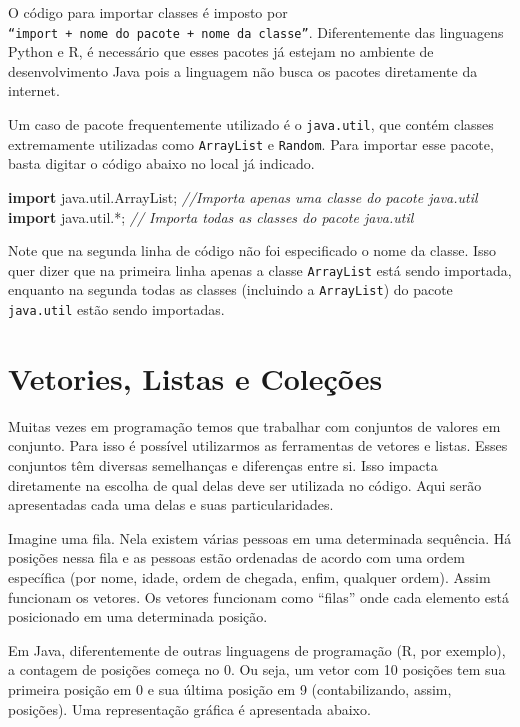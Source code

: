 \documentclass[
]{book}
\newenvironment{Shaded}{\begin{snugshade}}{\end{snugshade}}
\newcommand{\CommentTok}[1]{\textcolor[rgb]{0.56,0.35,0.01}{\textit{#1}}}
\newcommand{\ImportTok}[1]{#1}
\newcommand{\KeywordTok}[1]{\textcolor[rgb]{0.13,0.29,0.53}{\textbf{#1}}}
\begin{document}
O código para importar classes é imposto por \texttt{“import\ +\ nome\ do\ pacote\ +\ nome\ da\ classe”}. Diferentemente das linguagens Python e R, é necessário que esses pacotes já estejam no ambiente de desenvolvimento Java pois a linguagem não busca os pacotes diretamente da internet.

Um caso de pacote frequentemente utilizado é o \texttt{java.util}, que contém classes extremamente utilizadas como \texttt{ArrayList} e \texttt{Random}. Para importar esse pacote, basta digitar o código abaixo no local já indicado.

\begin{Shaded}
\begin{Highlighting}[]
\KeywordTok{import}\ImportTok{ java.util.ArrayList;} \CommentTok{//Importa apenas uma classe do pacote java.util}
\KeywordTok{import}\ImportTok{ java.util.*;} \CommentTok{// Importa todas as classes do pacote java.util}
\end{Highlighting}
\end{Shaded}

Note que na segunda linha de código não foi especificado o nome da classe. Isso quer dizer que na primeira linha apenas a classe \texttt{ArrayList} está sendo importada, enquanto na segunda todas as classes (incluindo a \texttt{ArrayList}) do pacote \texttt{java.util} estão sendo importadas.

\hypertarget{vetories-listas-e-coleuxe7uxf5es}{%
\chapter{Vetories, Listas e Coleções}\label{vetories-listas-e-coleuxe7uxf5es}}

Muitas vezes em programação temos que trabalhar com conjuntos de valores em conjunto. Para isso é possível utilizarmos as ferramentas de vetores e listas. Esses conjuntos têm diversas semelhanças e diferenças entre si. Isso impacta diretamente na escolha de qual delas deve ser utilizada no código. Aqui serão apresentadas cada uma delas e suas particularidades.

Imagine uma fila. Nela existem várias pessoas em uma determinada sequência. Há posições nessa fila e as pessoas estão ordenadas de acordo com uma ordem específica (por nome, idade, ordem de chegada, enfim, qualquer ordem). Assim funcionam os vetores. Os vetores funcionam como ``filas'' onde cada elemento está posicionado em uma determinada posição.

Em Java, diferentemente de outras linguagens de programação (R, por exemplo), a contagem de posições começa no 0. Ou seja, um vetor com 10 posições tem sua primeira posição em 0 e sua última posição em 9 (contabilizando, assim, posições). Uma representação gráfica é apresentada abaixo.
\end{document}
